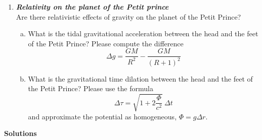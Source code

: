\documentclass[a4paper,12pt]{article}
\newcommand{\question}[1]{\textbf{\textit{#1}}}
\begin{document}
\begin{enumerate}
\item \question{Relativity on the planet of the Petit prince}\\
Are there relativistic effects of gravity on the planet of the Petit Prince?
\begin{enumerate}[(a)]
\item{What is the tidal gravitational acceleration between the head
    and the feet of the Petit Prince? Please compute the difference
\begin{equation}
\Delta g = \frac{GM}{R^2}-\frac{GM}{(R+1)^2} 
\end{equation}
}
\item{What is the gravitational time dilation between the head and the feet of the Petit Prince? Please use the formula
\begin{equation}
\Delta \tau = \sqrt{1+2\frac{\Phi}{c^2}}\:\Delta t
\end{equation}
and approximate the potential as homogeneous, $\Phi = g\Delta r$.
}
\end{enumerate}
\end{enumerate}
\newpage

{\bf Solutions}
\\
\end{document}
